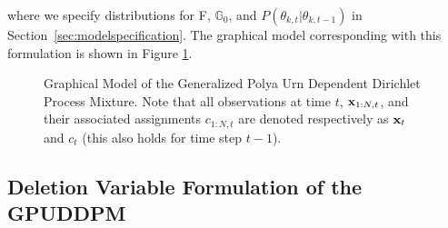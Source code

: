 \documentclass[twocolumn, final]{svjour3}
\begin{document}
where we specify distributions for F, $\mathbb{G}_{0}$, and $P(\theta_{k, t} | \theta_{k, t-1})$ in Section~\ref{sec:modelspecification}. The graphical model corresponding with this formulation is shown in Figure \ref{fig:gpuddpm_gm_1}.
\begin{figure}[h]
        \caption{\label{fig:gpuddpm_gm_1} Graphical Model of the Generalized Polya Urn Dependent Dirichlet Process Mixture. Note that all observations at time $t$, $\bold{x}_{1:N,t}$, and their associated assignments $c_{1:N,t}$ are denoted respectively as $\bold{x}_{t}$ and $c_{t}$ (this also holds for time step $t-1$).}
\end{figure}


\subsection{Deletion Variable Formulation of the GPUDDPM}
\end{document}
